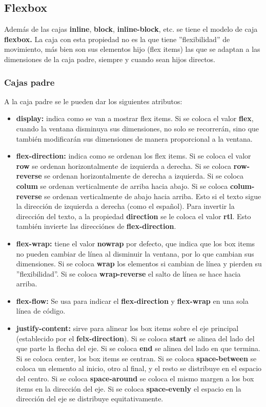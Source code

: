 \documentclass[10pt,oneside]{article}
\begin{document}
\begin{multicols}{2}
 \subsection{Flexbox}

    Además de las cajas \textbf{inline}, \textbf{block}, \textbf{inline-block}, etc. se tiene el modelo de caja \textbf{flexbox.} La caja con esta propiedad no es la que tiene ''flexibilidad'' de movimiento, más bien son sus elementos hijo (flex items) las que se adaptan a las dimensiones de la caja padre, siempre y cuando sean hijos directos.
\subsubsection{Cajas padre}
    A la caja padre se le pueden dar los siguientes atributos:
    \begin{itemize}
        \item \textbf{display:} indica como se van a mostrar flex items. Si se coloca el valor \textbf{flex}, cuando la ventana disminuya sus dimensiones, no solo se recorrerán, sino que también modificarán sus dimensiones de manera proporcional a la ventana.
        \item \textbf{flex-direction:} indica como se ordenan los flex items. Si se coloca el valor \textbf{row} se ordenan horizontalmente de izquierda a derecha. Si se coloca \textbf{row-reverse} se ordenan horizontalmente de derecha a izquierda. Si se coloca \textbf{colum} se ordenan verticalmente de arriba hacia abajo. Si se coloca \textbf{colum-reverse} se ordenan verticalmente de abajo hacia arriba. Esto si el texto sigue la dirección de izquierda a derecha (como el español). Para invertir la dirección del texto, a la propiedad \textbf{direction} se le coloca el valor \textbf{rtl}. Esto también invierte las direcciónes de \textbf{flex-direction}.
        \item \textbf{flex-wrap:} tiene el valor \textbf{nowrap} por defecto, que indica que los box items no pueden cambiar de línea al disminuir la ventana, por lo que cambian sus dimensiones. Si se coloca \textbf{wrap} los elementos si cambian de línea y pierden su ''flexibilidad''. Si se coloca \textbf{wrap-reverse} el salto de línea se hace hacia arriba.
        \item \textbf{flex-flow:} Se usa para indicar el \textbf{flex-direction} y \textbf{flex-wrap} en una sola línea de código.
        \item \textbf{justify-content:} sirve para alinear los box items sobre el eje principal (establecido por el \textbf{felx-direction}). Si se coloca \textbf{start} se alinea del lado del que parte la flecha del eje. Si se coloca \textbf{end} se alinea del lado en que termina. Si se coloca center, los box items se centran. Si se coloca \textbf{space-between} se coloca un elemento al inicio, otro al final, y el resto se distribuye en el espacio del centro. Si se coloca \textbf{space-around} se coloca el mismo margen a los box items en la dirección del eje. Si se coloca \textbf{space-evenly} el espacio en la dirección del eje se distribuye equitativamente.   

\end{itemize}
\end{multicols}
\end{document}
